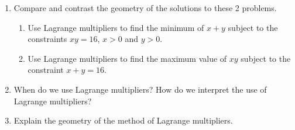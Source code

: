 \begin{enumerate}
\item  Compare and contrast the geometry of the solutions to these 2 problems.
\begin{enumerate} \item Use Lagrange multipliers to find the minimum of $x + y$ subject to the constraints 
$xy = 16$, $x > 0$ and $y > 0$.
\item Use Lagrange multipliers to find the maximum value of $xy$ subject to the constraint $x + y = 16.$  \cite{FWG} \end{enumerate}

\item  When do we use Lagrange multipliers?  How do we interpret the use of Lagrange multipliers?

\item  Explain the geometry of the method of Lagrange multipliers.\end{enumerate}
